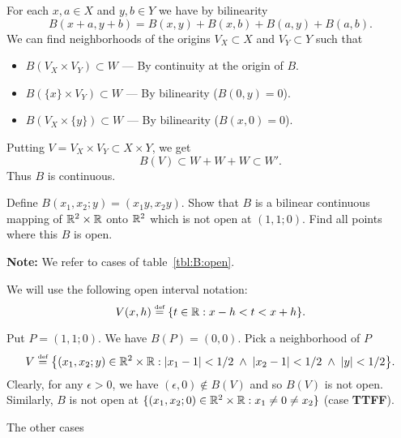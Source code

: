 \begin{enumerate}
For each \(x,a\in X\) and \(y,b\in Y\) we have by bilinearity
\begin{equation*}
B(x+a,y+b) = B(x,y) + B(x,b) + B(a,y) + B(a,b).
\end{equation*}
We can find neighborhoods of the origins
\(V_X \subset X\) and \(V_Y \subset Y\) such that 
\begin{itemize}
 \item \(B(V_X \times V_Y) \subset W\) --- By continuity at the origin of $B$.
 \item \(B(\{x\}\times V_Y) \subset W\) --- By bilinearity (\(B(0,y)=0\)).
 \item \(B(V_X\times \{y\}) \subset W\) --- By bilinearity  (\(B(x,0)=0\)).
\end{itemize}
Putting \(V = V_X \times V_Y \subset X\times Y\), we get
\begin{equation*}
 B(V) \subset W + W + W \subset W'.
\end{equation*}
Thus $B$ is continuous.


\begin{excopy}
Define \(B(x_1,x_2;y) = (x_1y, x_2y)\). 
Show that $B$ is a bilinear continuous mapping of 
\(\mathbb{R}^2\times\mathbb{R}\) onto \(\mathbb{R}^2\) which is not open at \((1,1;0)\).
Find all points where this $B$ is open.
\end{excopy}

\textbf{Note:} We refer to cases of table~\ref{tbl:B:open}.
\newcommand{\tbcase}[2]{\textbf{{\textsf{#1}}#2}}

We will use the following open interval notation:
\begin{equation*}
V(x,h) \stackrel{\mbox{\upshape\tiny def}}{=} \{t\in\mathbb{R}: x-h < t < x+h\}.
\end{equation*}


Put  \(P= (1,1;0)\). We have \(B(P) = (0,0)\). Pick a neighborhood of $P$
\begin{equation*}
V \stackrel{\mbox{\upshape\tiny def}}{=} \bigl\{(x_1,x_2;y) \in \mathbb{R}^2\times\mathbb{R} : 
           |x_1-1| < 1/2 \;\wedge\;
           |x_2-1| < 1/2 \;\wedge\;
           |y| < 1/2\bigr\}.
\end{equation*}
Clearly, for any \(\epsilon > 0\), we have
 \((\epsilon, 0) \notin B(V)\)
and so \(B(V)\) is not open.
Similarly, $B$ is not open at 
\(\{(x_1,x_2;0)\in \mathbb{R}^2\times\mathbb{R}: x_1\neq 0 \neq x_2\}\)
(case \tbcase{TTF}{F}).

The other cases
\begin{itemize}


\end{itemize}
\end{enumerate}
